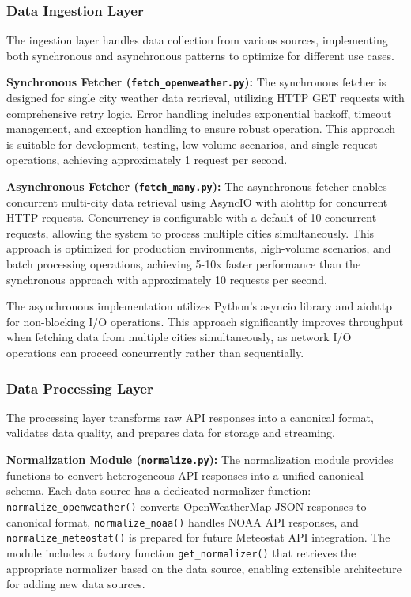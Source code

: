 \documentclass[12pt,a4paper]{article}
\begin{document}
\subsubsection{Data Ingestion Layer}

The ingestion layer handles data collection from various sources, implementing both synchronous and asynchronous patterns to optimize for different use cases.

\textbf{Synchronous Fetcher (\texttt{fetch\_openweather.py}):} The synchronous fetcher is designed for single city weather data retrieval, utilizing HTTP GET requests with comprehensive retry logic. Error handling includes exponential backoff, timeout management, and exception handling to ensure robust operation. This approach is suitable for development, testing, low-volume scenarios, and single request operations, achieving approximately 1 request per second.

\textbf{Asynchronous Fetcher (\texttt{fetch\_many.py}):} The asynchronous fetcher enables concurrent multi-city data retrieval using AsyncIO with aiohttp for concurrent HTTP requests. Concurrency is configurable with a default of 10 concurrent requests, allowing the system to process multiple cities simultaneously. This approach is optimized for production environments, high-volume scenarios, and batch processing operations, achieving 5-10x faster performance than the synchronous approach with approximately 10 requests per second.

The asynchronous implementation utilizes Python's asyncio library and aiohttp for non-blocking I/O operations. This approach significantly improves throughput when fetching data from multiple cities simultaneously, as network I/O operations can proceed concurrently rather than sequentially.

\subsubsection{Data Processing Layer}

The processing layer transforms raw API responses into a canonical format, validates data quality, and prepares data for storage and streaming.

\textbf{Normalization Module (\texttt{normalize.py}):} The normalization module provides functions to convert heterogeneous API responses into a unified canonical schema. Each data source has a dedicated normalizer function: \texttt{normalize\_openweather()} converts OpenWeatherMap JSON responses to canonical format, \texttt{normalize\_noaa()} handles NOAA API responses, and \texttt{normalize\_meteostat()} is prepared for future Meteostat API integration. The module includes a factory function \texttt{get\_normalizer()} that retrieves the appropriate normalizer based on the data source, enabling extensible architecture for adding new data sources.
\end{document}
